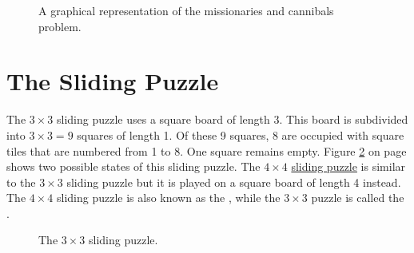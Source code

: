 \begin{figure}[!ht]
  \centering
  \caption{A graphical representation of the missionaries and cannibals problem.}
  \label{fig:missionaries.pdf}
\end{figure}


\section{The Sliding Puzzle}
The $3 \times 3$ sliding puzzle uses a
square board of length 3.  This board is subdivided into $3 \times 3 = 9$ squares of length 1.  Of
these 9 squares, 8 are occupied with square tiles that are numbered from 1 to 8.  One square remains
empty. Figure \ref{fig:8-puzzle.pdf} on page \pageref{fig:8-puzzle.pdf} shows two possible states of this
sliding puzzle.  The $4 \times 4$ \href{https://en.wikipedia.org/wiki/15_puzzle}{sliding puzzle}
is similar to the $3 \times 3$ sliding puzzle but it is played on a square board of length 4
instead.  The $4 \times 4$ sliding puzzle is also known as the , while the $3 \times 3$ puzzle is
called the .

\begin{figure}[!ht]
\centering
{}
\caption{The $3 \times 3$ sliding puzzle.}
\label{fig:8-puzzle.pdf}
\end{figure}

